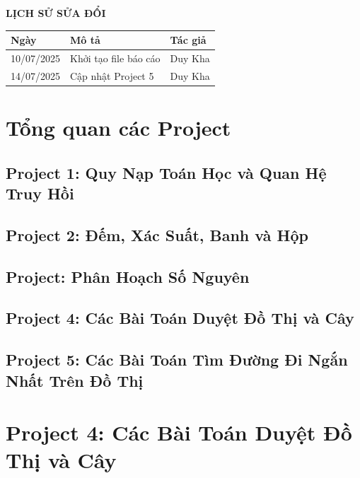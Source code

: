 \documentclass[12pt,a4paper]{article}
\begin{document}
\begin{center}
{\Huge\bfseries LỊCH SỬ SỬA ĐỔI\par}
\end{center}

\renewcommand{\arraystretch}{1.5}
\begin{center}
\begin{longtable}{|p{3cm}|p{8cm}|p{3cm}|}
\hline
\textbf{Ngày} & \textbf{Mô tả} & \textbf{Tác giả} \\
\hline
\endhead
10/07/2025 & Khởi tạo file báo cáo & Duy Kha\\
\hline
14/07/2025 & Cập nhật Project 5 & Duy Kha\\
\hline
\end{longtable}
\end{center}

\newpage
\tableofcontents

\newpage

\section{Tổng quan các Project}

\subsection{Project 1: Quy Nạp Toán Học và Quan Hệ Truy Hồi}

\subsection{Project 2: Đếm, Xác Suất, Banh và Hộp}

\subsection{Project: Phân Hoạch Số Nguyên}

\subsection{Project 4: Các Bài Toán Duyệt Đồ Thị và Cây}

\subsection{Project 5: Các Bài Toán Tìm Đường Đi Ngắn Nhất Trên Đồ Thị}

\newpage

\section{Project 4: Các Bài Toán Duyệt Đồ Thị và Cây}
\end{document}

